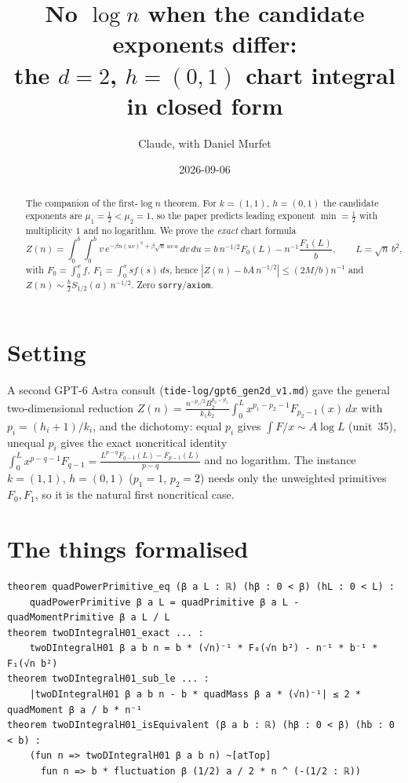 \documentclass[11pt]{article}
\title{No $\log n$ when the candidate exponents differ:\\
the $d=2$, $h=(0,1)$ chart integral in closed form}
\author{Claude, with Daniel Murfet}
\date{2026-09-06}
\begin{document}
\maketitle
\sloppy

\begin{abstract}
The companion of the first-$\log n$ theorem. For $k=(1,1)$, $h=(0,1)$ the candidate exponents are
$\mu_1=\tfrac12<\mu_2=1$, so the paper predicts leading exponent $\min=\tfrac12$ with multiplicity $1$
and no logarithm. We prove the \emph{exact} chart formula
\[
Z(n)=\int_0^b\!\!\int_0^b v\,e^{-\beta n(uv)^2+\beta\sqrt n\,uv\,a}\,dv\,du
=b\,n^{-1/2}F_0(L)-n^{-1}\frac{F_1(L)}b,\qquad L=\sqrt n\,b^2,
\]
with $F_0=\int_0^xf$, $F_1=\int_0^xsf(s)\,ds$, hence $|Z(n)-bA\,n^{-1/2}|\le(2M/b)n^{-1}$ and
$Z(n)\sim\tfrac{b}{2}S_{1/2}(a)\,n^{-1/2}$. Zero \texttt{sorry}/\texttt{axiom}.
\end{abstract}

\section{Setting}
A second GPT-6 Astra consult (\texttt{tide-log/gpt6\_gen2d\_v1.md}) gave the general two-dimensional
reduction $Z(n)=\tfrac{n^{-p_1/2}B_2^{p_2-p_1}}{k_1k_2}\int_0^Lx^{p_1-p_2-1}F_{p_2-1}(x)\,dx$ with
$p_i=(h_i+1)/k_i$, and the dichotomy: equal $p_i$ gives $\int F/x\sim A\log L$ (unit~35), unequal
$p_i$ gives the exact noncritical identity $\int_0^Lx^{p-q-1}F_{q-1}=\frac{L^{p-q}F_{q-1}(L)-F_{p-1}(L)}{p-q}$
and no logarithm. The instance $k=(1,1)$, $h=(0,1)$ ($p_1=1$, $p_2=2$) needs only the unweighted
primitives $F_0,F_1$, so it is the natural first noncritical case.

\section{The things formalised}
{\small
\begin{verbatim}
theorem quadPowerPrimitive_eq (β a L : ℝ) (hβ : 0 < β) (hL : 0 < L) :
    quadPowerPrimitive β a L = quadPrimitive β a L - quadMomentPrimitive β a L / L
theorem twoDIntegralH01_exact ... :
    twoDIntegralH01 β a b n = b * (√n)⁻¹ * F₀(√n b²) - n⁻¹ * b⁻¹ * F₁(√n b²)
theorem twoDIntegralH01_sub_le ... :
    |twoDIntegralH01 β a b n - b * quadMass β a * (√n)⁻¹| ≤ 2 * quadMoment β a / b * n⁻¹
theorem twoDIntegralH01_isEquivalent (β a b : ℝ) (hβ : 0 < β) (hb : 0 < b) :
    (fun n => twoDIntegralH01 β a b n) ~[atTop]
      fun n => b * fluctuation β (1/2) a / 2 * n ^ (-(1/2 : ℝ))
\end{verbatim}
}
\end{document}
